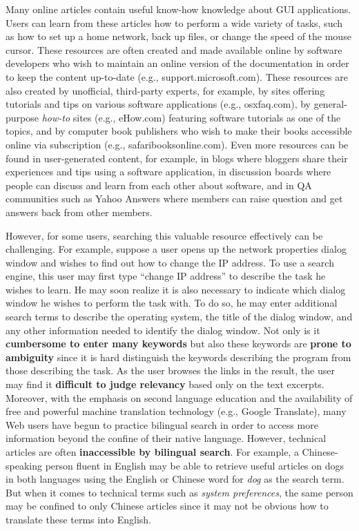 \documentclass{www2010-submission}
\begin{document}
Many online articles contain useful know-how knowledge about GUI
applications. Users can learn from these articles how to perform a
wide variety of tasks, such as how to set up a home network, back up
files, or change the speed of the mouse cursor. These resources are
often created and made available online by software developers who
wish to maintain an online version of the documentation in order to keep the content up-to-date (e.g.,
support.microsoft.com). These resources are also created by
unofficial, third-party experts, for example, by sites offering
tutorials and tips on various software applications (e.g.,
osxfaq.com), by general-purpose \emph{how-to} sites (e.g., eHow.com)
featuring software tutorials as one of the topics, and by computer
book publishers who wish to make their books accessible online via
subscription (e.g., safaribooksonline.com). Even more resources can be
found in user-generated content, for example, in blogs where bloggers
share their experiences and tips using a software application, in
discussion boards where people can discuss and learn from each other
about software, and in QA communities such as Yahoo Answers where
members can raise question and get answers back from other members.

However, for some users, searching this valuable resource
effectively can be challenging. For example, suppose a user opens
up the network properties dialog window and wishes to find out how
to change the IP address. To use a search engine, this user may
first type ``change IP address'' to describe the task he wishes to
learn. He may soon realize it is also necessary to indicate which
dialog window he wishes to perform the task with. To do so, he may
enter additional search terms to describe the operating system,
the title of the dialog window, and any other information needed
to identify the dialog window. Not only is it \textbf{cumbersome
to enter many keywords} but also these keywords are \textbf{prone
to ambiguity} since it is hard distinguish the keywords describing
the program from those describing the task. As the user
browses the links in the result, the user may find it
\textbf{difficult to judge relevancy} based only on the text
excerpts. Moreover, with the emphasis on second language education and the
availability of free and powerful machine translation technology
(e.g., Google Translate),  many Web users have begun to practice
bilingual search in order to access more information beyond the
confine of their native language. However, technical articles are
often \textbf{inaccessible by bilingual search}. For example, a
Chinese-speaking person fluent in English may be able to retrieve
useful articles on dogs in both languages using the English or
Chinese word for \emph{dog} as the search term. But when it comes
to technical terms such as \emph{system preferences}, the same
person may be confined to only Chinese articles since it may not be
obvious how to translate these terms into English.
\end{document}
